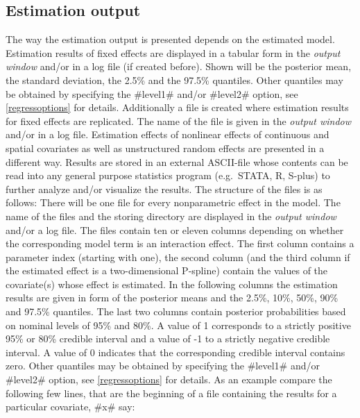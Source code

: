 \subsection{Estimation output}

The way the estimation output is presented depends on the
estimated model. Estimation results of fixed effects are displayed
in a tabular form in the {\em output window} and/or in a log file
(if created before). Shown will be the posterior mean, the
standard deviation, the 2.5\% and the 97.5\% quantiles. Other
quantiles may be obtained by specifying the #level1# and/or
#level2# option, see \autoref{regressoptions} for details.
Additionally a file is created where estimation results for fixed
effects are replicated. The name of the file is given in the {\em
output window} and/or in a log file. Estimation effects of
nonlinear effects of continuous and spatial covariates as well as
unstructured random effects are presented in a different way.
Results are stored in an external ASCII-file whose contents can be
read into any general purpose statistics program (e.g.~STATA, R,
S-plus) to further analyze and/or visualize the results. The
structure of the files is as follows: There will be one file for
every nonparametric effect in the model. The name of the files and
the storing directory are displayed in the {\em output window}
and/or a log file. The files contain ten or eleven columns
depending on whether the corresponding model term is an
interaction effect. The first column contains a parameter index
(starting with one), the second column (and the third column if
the estimated effect is a two-dimensional P-spline) contain the
values of the covariate(s) whose effect is estimated. In the
following columns the estimation results are given in form of the
posterior means and the 2.5\%, 10\%, 50\%, 90\% and 97.5\%
quantiles. The last two columns contain posterior probabilities
based on nominal levels of 95\% and 80\%. A value of 1 corresponds
to a strictly positive 95\% or 80\% credible interval and a value
of -1 to a strictly negative credible interval. A value of 0
indicates that the corresponding credible interval contains zero.
Other quantiles may be obtained by specifying the #level1# and/or
#level2# option, see \autoref{regressoptions} for details. As an
example compare the following few lines, that are the beginning of
a file containing the results for a particular covariate, #x# say:


